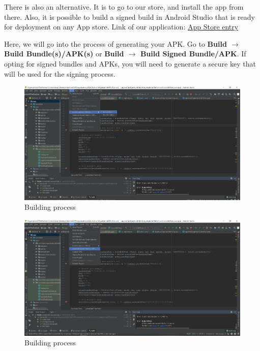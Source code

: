 			There is also an alternative. It is to go to our store, and install the app from there. Also, it is possible to build a signed build in Android Studio that is ready for deployment on any App store. Link of our application: \href{https://play.google.com/store/apps/details?id=com.hfad.organizationofthefestival}{App Store entry}
			
			Here, we will go into the process of generating your APK. Go to \textbf{Build $\rightarrow$ Build Bundle(s)/APK(s)} or \textbf{Build $\rightarrow$ Build Signed Bundle/APK}. If opting for signed bundles and APKs, you will need to generate a secure key that will be used for the signing process.
			
			\begin{figure}[H]
				\includegraphics[width=\linewidth]{images/Deploy_M_3.png}
				\caption{Building process}
				\label{fig:install_3}
			\end{figure}
			
			\begin{figure}[H]
				\includegraphics[width=\linewidth]{images/Deploy_M_4.png}
				\caption{Building process}
				\label{fig:install_4}
			\end{figure}
			
